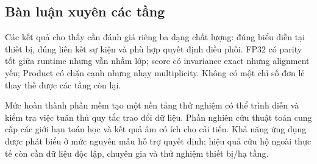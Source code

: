 \subsection{Bàn luận xuyên các tầng}
Các kết quả cho thấy cần đánh giá riêng ba dạng chất lượng: đúng biểu diễn tại thiết bị, đúng liên kết sự kiện và phù hợp quyết định điều phối. FP32 có parity tốt giữa runtime nhưng vẫn nhầm lớp; score có invariance exact nhưng alignment yếu; Product có chặn cạnh nhưng nhạy multiplicity. Không có một chỉ số đơn lẻ thay thế được các tầng còn lại.

Mức hoàn thành phần mềm tạo một nền tảng thử nghiệm có thể trình diễn và kiểm tra việc tuân thủ quy tắc trao đổi dữ liệu. Phần nghiên cứu thuật toán cung cấp các giới hạn toán học và kết quả âm có ích cho cải tiến. Khả năng ứng dụng được phát biểu ở mức nguyên mẫu hỗ trợ quyết định; hiệu quả cứu hộ ngoài thực tế còn cần dữ liệu độc lập, chuyên gia và thử nghiệm thiết bị/hạ tầng.
